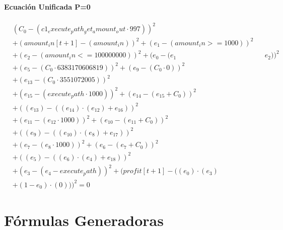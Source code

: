 \documentclass[10pt, a4paper]{article}
\begin{document}
\subsection*{Ecuación Unificada P=0}
\begin{align*}
& (C_{0} - (c1_execute_path_get_amount_out  \cdot  997))^{2} \\
& + (amount_in[t+1] - (amount_in))^{2} + (e_{1} - (amount_in >= 1000))^{2} \\
& + (e_{2} - (amount_in <= 100000000))^{2} + (e_{0} - (e_{1} && e_{2}))^{2} \\
& + (e_{5} - (C_{0}  \cdot  6383170606819))^{2} + (e_{9} - (C_{0}  \cdot  0))^{2} \\
& + (e_{13} - (C_{0}  \cdot  3551072005))^{2} \\
& + (e_{15} - (execute_path  \cdot  1000))^{2} + (e_{14} - (e_{15} + C_{0}))^{2} \\
& + ((e_{13}) - ((e_{14})  \cdot  (e_{12}) + e_{16}))^{2} \\
& + (e_{11} - (e_{12}  \cdot  1000))^{2} + (e_{10} - (e_{11} + C_{0}))^{2} \\
& + ((e_{9}) - ((e_{10})  \cdot  (e_{8}) + e_{17}))^{2} \\
& + (e_{7} - (e_{8}  \cdot  1000))^{2} + (e_{6} - (e_{7} + C_{0}))^{2} \\
& + ((e_{5}) - ((e_{6})  \cdot  (e_{4}) + e_{18}))^{2} \\
& + (e_{3} - (e_{4} - execute_path))^{2} + (profit[t+1] - ((e_{0})  \cdot  (e_{3}) \\
& + (1 - e_{0})  \cdot  (0)))^{2} = 0
\end{align*}\part{Fórmulas Generadoras}
\end{document}

